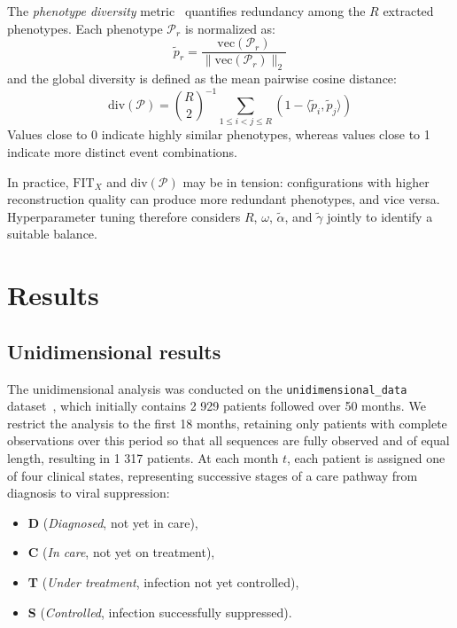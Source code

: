 \documentclass[a4paper]{cas-sc}
\newcommand{\code}[1]{\texttt{#1}}
\begin{document}
The \emph{phenotype diversity} metric~\cite{sebia2024swotted} quantifies redundancy among the $R$ extracted phenotypes. Each phenotype $\mathcal{P}_r$ is normalized as:
\begin{equation}
  \tilde{p}_r = \frac{\mathrm{vec}(\mathcal{P}_r)} {\|\mathrm{vec}(\mathcal{P}_r)\|_2}
  \label{eq:normalisation}
\end{equation}
and the global diversity is defined as the mean pairwise cosine distance:
\begin{equation}
  \mathrm{div}(\mathcal{P}) = \binom{R}{2}^{-1} \sum_{1\leq i<j\leq R} \left(1-\langle\tilde{p}_i,\tilde{p}_j\rangle\right)
  \label{eq:div_globale}
\end{equation}
Values close to 0 indicate highly similar phenotypes, whereas values close to 1 indicate more distinct event combinations.
 
In practice, $\mathrm{FIT}_X$ and $\mathrm{div}(\mathcal{P})$ may be in tension: configurations with higher reconstruction quality can produce more redundant phenotypes, and vice versa. 
Hyperparameter tuning therefore considers $R$, $\omega$, $\tilde{\alpha}$, and $\tilde{\gamma}$ jointly to identify a suitable balance.

\section{Results}\label{sec:results}

\subsection{Unidimensional results}\label{sec:uni_res}

The unidimensional analysis was conducted on the \code{unidimensional\_data} dataset~\citep{larmarange_analyseR}, which initially contains 2 929 patients followed over 50 months. 
We restrict the analysis to the first 18 months, retaining only patients with complete observations over this period so that all sequences are fully observed and of equal length, resulting in 1 317 patients. 
At each month $t$, each patient is assigned one of four clinical states, representing successive stages of a care pathway from diagnosis to viral suppression: 
\begin{itemize}
  \item \textbf{D} (\textit{Diagnosed}, not yet in care),
  \item \textbf{C} (\textit{In care}, not yet on treatment),
  \item \textbf{T} (\textit{Under treatment}, infection not yet controlled),
  \item \textbf{S} (\textit{Controlled}, infection successfully suppressed).
\end{itemize}
\end{document}
